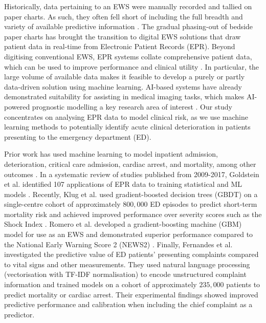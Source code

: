 \documentclass[fleqn,10pt]{wlscirep}
\begin{document}
Historically, data pertaining to an EWS were manually recorded and tallied on paper charts. As such, they often fell short of including the full breadth and variety of available predictive information \cite{Gerry20}. The gradual phasing-out of bedside paper charts has brought the transition to digital EWS solutions that draw patient data in real-time from Electronic Patient Records (EPR). Beyond digitising conventional EWS, EPR systems collate comprehensive patient data, which can be used to improve performance and clinical utility \cite{Goldstein17}. In particular, the large volume of available data makes it feasible to develop a purely or partly data-driven solution using machine learning. AI-based systems have already demonstrated suitability for assisting in medical imaging tasks, which makes AI-powered prognostic modelling a key research area of interest \cite{Obermeyer16}. Our study concentrates on analysing EPR data to model clinical risk, as we use machine learning methods to potentially identify acute clinical deterioration in patients presenting to the emergency department (ED).

Prior work has used machine learning to model inpatient admission, deterioration, critical care admission, cardiac arrest, and mortality, among other outcomes \cite{Grant20}. In a systematic review of studies published from 2009-2017, Goldstein et al. identified 107 applications of EPR data to training statistical and ML models \cite{Goldstein17}. Recently, Klug et al. \cite{Klug20} used gradient-boosted decision trees (GBDT) on a single-centre cohort of approximately $800,000$ ED episodes to predict short-term mortality risk and achieved improved performance over severity scores such as the Shock Index \cite{Torabi16}. Romero et al. \cite{Romero21} developed a gradient-boosting machine (GBM) model for use as an EWS and demonstrated superior performance compared to the National Early Warning Score 2 (NEWS2) \cite{RCP17}. Finally, Fernandes et al. \cite{Fernandes20} investigated the predictive value of ED patients’ presenting complaints compared to vital signs and other measurements. They used natural language processing (vectorisation with TF-IDF normalisation) to encode unstructured complaint information and trained models on a cohort of approximately $235,000$ patients to predict mortality or cardiac arrest. Their experimental findings showed improved predictive performance and calibration when including the chief complaint as a predictor.
\end{document}
